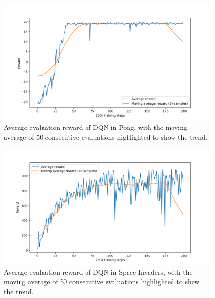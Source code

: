 \begin{figure}
    \includegraphics[width=\textwidth]{pictures/experiments/baseline_pong}
    \centering
    \caption[Average performance of DQN in Pong]{Average evaluation reward of 
	    DQN in Pong, with the moving average of 50 consecutive evaluations 
	    highlighted to show the trend.}
    \label{f:P_baseline}
\end{figure}
%
%
\begin{figure}
    \includegraphics[width=\textwidth]{pictures/experiments/baseline_space_invaders}
    \centering
    \caption[Average performance of DQN in Space Invaders]{Average evaluation 
	    reward of DQN in Space Invaders, with the moving average of 50 
	    consecutive evaluations highlighted to show the trend.}
    \label{f:SI_baseline}
\end{figure}
%

